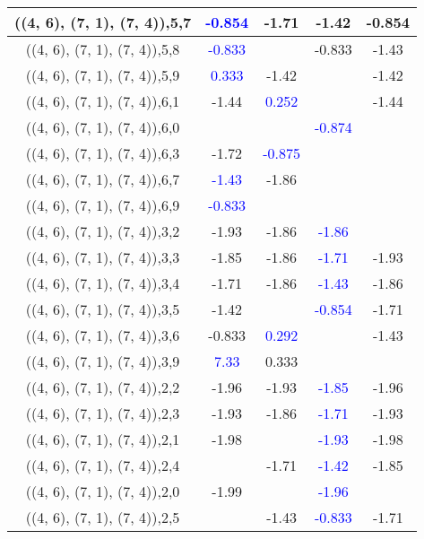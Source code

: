 \documentclass{article}
\begin{document}
\begin{center}
\begin{longtable}{|c|c|c|c|c|}
        	\hline
        	((4, 6), (7, 1), (7, 4)),5,7& \textcolor{blue}{-0.854}&-1.71&-1.42&-0.854\\
        	\hline
        	((4, 6), (7, 1), (7, 4)),5,8& \textcolor{blue}{-0.833}&&-0.833&-1.43\\
        	\hline
        	((4, 6), (7, 1), (7, 4)),5,9& \textcolor{blue}{0.333}&-1.42&&-1.42\\
        	\hline
        	((4, 6), (7, 1), (7, 4)),6,1&-1.44& \textcolor{blue}{0.252}&&-1.44\\
        	\hline
        	((4, 6), (7, 1), (7, 4)),6,0&&& \textcolor{blue}{-0.874}&\\
        	\hline
        	((4, 6), (7, 1), (7, 4)),6,3&-1.72& \textcolor{blue}{-0.875}&&\\
        	\hline
        	((4, 6), (7, 1), (7, 4)),6,7& \textcolor{blue}{-1.43}&-1.86&&\\
        	\hline
        	((4, 6), (7, 1), (7, 4)),6,9& \textcolor{blue}{-0.833}&&&\\
        	\hline
        	((4, 6), (7, 1), (7, 4)),3,2&-1.93&-1.86& \textcolor{blue}{-1.86}&\\
        	\hline
        	((4, 6), (7, 1), (7, 4)),3,3&-1.85&-1.86& \textcolor{blue}{-1.71}&-1.93\\
        	\hline
        	((4, 6), (7, 1), (7, 4)),3,4&-1.71&-1.86& \textcolor{blue}{-1.43}&-1.86\\
        	\hline
        	((4, 6), (7, 1), (7, 4)),3,5&-1.42&& \textcolor{blue}{-0.854}&-1.71\\
        	\hline
        	((4, 6), (7, 1), (7, 4)),3,6&-0.833& \textcolor{blue}{0.292}&&-1.43\\
        	\hline
        	((4, 6), (7, 1), (7, 4)),3,9& \textcolor{blue}{7.33}&0.333&&\\
        	\hline
        	((4, 6), (7, 1), (7, 4)),2,2&-1.96&-1.93& \textcolor{blue}{-1.85}&-1.96\\
        	\hline
        	((4, 6), (7, 1), (7, 4)),2,3&-1.93&-1.86& \textcolor{blue}{-1.71}&-1.93\\
        	\hline
        	((4, 6), (7, 1), (7, 4)),2,1&-1.98&& \textcolor{blue}{-1.93}&-1.98\\
        	\hline
        	((4, 6), (7, 1), (7, 4)),2,4&&-1.71& \textcolor{blue}{-1.42}&-1.85\\
        	\hline
        	((4, 6), (7, 1), (7, 4)),2,0&-1.99&& \textcolor{blue}{-1.96}&\\
        	\hline
        	((4, 6), (7, 1), (7, 4)),2,5&&-1.43& \textcolor{blue}{-0.833}&-1.71\\

\end{longtable}
\end{center}
\end{document}

